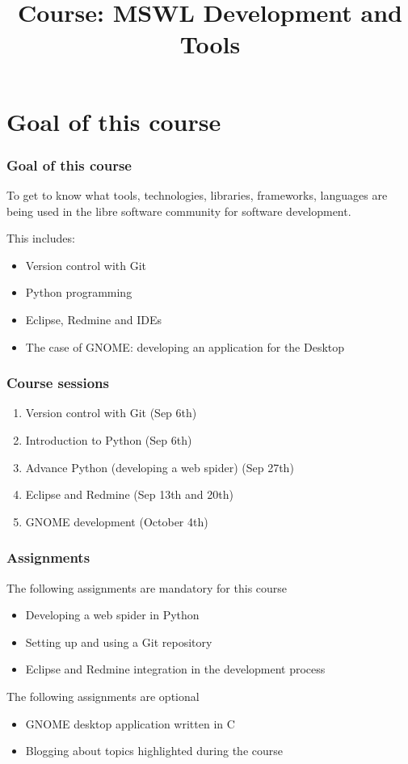 \documentclass[11pt]{beamer}
\institute{israel.herraiz@upm.es \\ Universidad Politécnica de Madrid}
\title{Course: MSWL Development and Tools}
\author{}
\begin{document}
\maketitle


\section{Goal of this course}
\label{sec-1}

   
\begin{frame}[fragile]\frametitle{Goal of this course}
\label{sec-1_1}

To get to know what tools, technologies, libraries, frameworks,
languages are being used in the libre software community for software
development.

This includes:

\begin{itemize}

\item Version control with Git
\item Python programming
\item Eclipse, Redmine and IDEs
\item The case of GNOME: developing an application for the Desktop

\end{itemize}
\end{frame}

\begin{frame}[fragile]\frametitle{Course sessions}
\label{sec-1_2}

\begin{enumerate}
\item Version control with Git (Sep 6th)
\item Introduction to Python (Sep 6th)
\item Advance Python (developing a web spider) (Sep 27th)
\item Eclipse and Redmine (Sep 13th and 20th)
\item GNOME development (October 4th)
\end{enumerate}


\end{frame}
\begin{frame}[fragile]\frametitle{Assignments}
\label{sec-1_3}

The following assignments are mandatory for this course
\begin{itemize}
\item Developing a web spider in Python
\item Setting up and using a Git repository
\item Eclipse and Redmine integration in the development process
\end{itemize}


The following assignments are optional
\begin{itemize}
\item GNOME desktop application written in C
\item Blogging about topics highlighted during the course
\end{itemize}
\end{frame}
\end{document}
